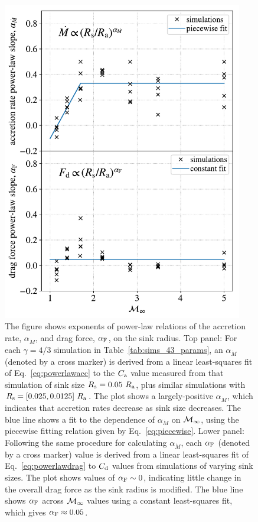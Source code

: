 \begin{figure}[tbp]
\centering
 \includegraphics[width=10.5cm]{figures/common_envelope/Sink_Scaling.pdf}
 \caption{The figure shows exponents of power-law relations of the accretion rate, $\alpha_{\dot M}$, and drag force, $\alpha_{\rm F}$, on the sink radius. Top panel: For each $\gamma = 4/3$ simulation in Table~\ref{tab:sims_43_params}, an $\alpha_{\dot M}$ (denoted by a cross marker) is derived from a linear least-squares fit of Eq.~\eqref{eq:powerlawacc} to the $C_{\rm a}$ value measured from that simulation of sink size $R_{\rm s} = 0.05~R_{\rm a}$, plus similar simulations with $R_{\rm s} = [0.025, 0.0125]~R_{\rm a}$. The plot shows a largely-positive $\alpha_{\dot M}$, which indicates that accretion rates decrease as sink size decreases. The blue line shows a fit to the dependence of $\alpha_{\dot M}$ on $\cal {M}_\infty$, using the piecewise fitting relation given by Eq.~\eqref{eq:piecewise}.
 Lower panel: Following the same procedure for calculating $\alpha_{\dot M}$, each $\alpha_{\rm F}$ (denoted by a cross marker) value is derived from a linear least-squares fit of Eq.~\eqref{eq:powerlawdrag} to $C_{\rm d}$ values from simulations of varying sink sizes. The plot shows values of $\alpha_{\rm F} \sim 0$, indicating little change in the overall drag force as the sink radius is modified. The blue line shows $\alpha_{\rm F}$ across $\cal {M}_\infty$ values using a constant least-squares fit, which gives $\alpha_{\rm F} \approx 0.05$.
 \label{fig:sink} }
\vspace{5mm}
\end{figure}


